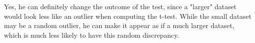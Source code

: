 Yes, he can definitely change the outcome of the test, since a "larger" dataset would look less like an outlier when computing the t-test. While the small dataset may be a random outlier, he can make it appear as if a much larger dataset, which is much less likely to have this random discrepancy.